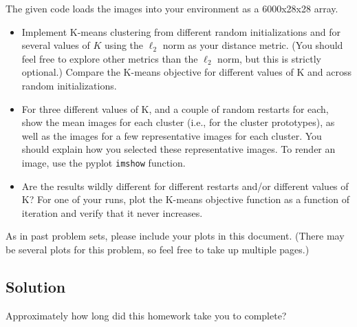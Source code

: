 \documentclass[submit]{harvardml}
\begin{document}
	\begin{problem}
		The given code loads the images into your environment as a 6000x28x28 array.
		
		\begin{itemize}
			\item Implement K-means clustering
			from different random initializations 
			and for several values of $K$ using the 
			$\ell_2$ norm as your
			distance metric. (You should feel free to explore other metrics 
			than the $\ell_2$ norm, but this is strictly optional.)  Compare the 
			K-means objective for different values of K and across random
			initializations.
			\item For three different values of K,
			and a couple of random restarts for each, 
			show the mean images for each cluster (i.e., for
			the cluster prototypes), as well as the images for a 
			few representative images for each cluster. You should explain how you selected
			these representative images. To render an image, use the pyplot \texttt{imshow} function. 
			
			\item Are the results wildly different for different
			restarts and/or different 
			values of K?
			For one of your runs, plot the K-means objective function as a function of iteration and verify that
			it never increases.
			
			
		\end{itemize}
		
		
		As in past problem sets, please include your plots in this
		document. (There may be several plots for this problem, so feel free
		to take up multiple pages.)
		
		
		
		
	\end{problem}
	\subsection*{Solution}
	
	
	
	
	\newpage
	\begin{problem}[Calibration, 1pt]
		Approximately how long did this homework take you to complete?
	\end{problem}
	
	
\end{document}
